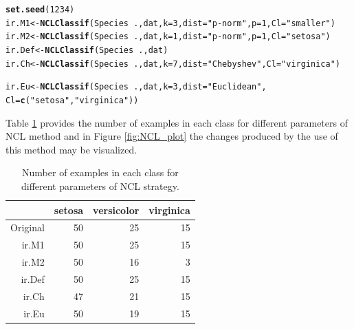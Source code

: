 \documentclass[10pt,a4paper]{article}\usepackage[]{graphicx}\usepackage[]{color}
\makeatletter
\newcommand{\hlnum}[1]{\textcolor[rgb]{0.686,0.059,0.569}{#1}}%
\newcommand{\hlstr}[1]{\textcolor[rgb]{0.192,0.494,0.8}{#1}}%
\newcommand{\hlopt}[1]{\textcolor[rgb]{0,0,0}{#1}}%
\newcommand{\hlstd}[1]{\textcolor[rgb]{0.345,0.345,0.345}{#1}}%
\newcommand{\hlkwb}[1]{\textcolor[rgb]{0.69,0.353,0.396}{#1}}%
\newcommand{\hlkwc}[1]{\textcolor[rgb]{0.333,0.667,0.333}{#1}}%
\newcommand{\hlkwd}[1]{\textcolor[rgb]{0.737,0.353,0.396}{\textbf{#1}}}%
\newenvironment{kframe}{%
 \def\at@end@of@kframe{}%
 \ifinner\ifhmode%
  \def\at@end@of@kframe{\end{minipage}}%
  \begin{minipage}{\columnwidth}%
 \fi\fi%
 \def\FrameCommand##1{\hskip\@totalleftmargin \hskip-\fboxsep
 \colorbox{shadecolor}{##1}\hskip-\fboxsep
     \hskip-\linewidth \hskip-\@totalleftmargin \hskip\columnwidth}%
 \MakeFramed {\advance\hsize-\width
   \@totalleftmargin\z@ \linewidth\hsize
   \@setminipage}}%
 {\par\unskip\endMakeFramed%
 \at@end@of@kframe}
\newenvironment{knitrout}{}{} %
\makeatother
\begin{document}
\begin{knitrout}\footnotesize
{}\color{fgcolor}\begin{kframe}
\begin{alltt}
\hlkwd{set.seed}\hlstd{(}\hlnum{1234}\hlstd{)}
\hlstd{ir.M1} \hlkwb{<-} \hlkwd{NCLClassif}\hlstd{(Species}\hlopt{~}\hlstd{., dat,} \hlkwc{k}\hlstd{=}\hlnum{3}\hlstd{,} \hlkwc{dist}\hlstd{=}\hlstr{"p-norm"}\hlstd{,} \hlkwc{p}\hlstd{=}\hlnum{1}\hlstd{,} \hlkwc{Cl}\hlstd{=}\hlstr{"smaller"}\hlstd{)}
\hlstd{ir.M2}\hlkwb{<-} \hlkwd{NCLClassif}\hlstd{(Species}\hlopt{~}\hlstd{., dat,} \hlkwc{k}\hlstd{=}\hlnum{1}\hlstd{,} \hlkwc{dist}\hlstd{=}\hlstr{"p-norm"}\hlstd{,} \hlkwc{p}\hlstd{=}\hlnum{1}\hlstd{,} \hlkwc{Cl}\hlstd{=}\hlstr{"setosa"}\hlstd{)}
\hlstd{ir.Def} \hlkwb{<-} \hlkwd{NCLClassif}\hlstd{(Species}\hlopt{~}\hlstd{., dat)}
\hlstd{ir.Ch} \hlkwb{<-} \hlkwd{NCLClassif}\hlstd{(Species}\hlopt{~}\hlstd{., dat,} \hlkwc{k}\hlstd{=}\hlnum{7}\hlstd{,} \hlkwc{dist}\hlstd{=}\hlstr{"Chebyshev"}\hlstd{,} \hlkwc{Cl}\hlstd{=}\hlstr{"virginica"}\hlstd{)}
\end{alltt}


{\ttfamily\noindent\color{warningcolor}{\#\# Warning: ENNClassif found no examples to remove!}}\begin{alltt}
\hlstd{ir.Eu} \hlkwb{<-} \hlkwd{NCLClassif}\hlstd{(Species}\hlopt{~}\hlstd{., dat,} \hlkwc{k}\hlstd{=}\hlnum{3}\hlstd{,} \hlkwc{dist}\hlstd{=}\hlstr{"Euclidean"}\hlstd{,}
                    \hlkwc{Cl}\hlstd{=}\hlkwd{c}\hlstd{(}\hlstr{"setosa"}\hlstd{,} \hlstr{"virginica"}\hlstd{))}
\end{alltt}
\end{kframe}
\end{knitrout}


Table \ref{tab:iris_NCL_table} provides the number of examples in each class for different parameters of NCL method and in Figure \ref{fig:NCL_plot} the changes produced by the use of this method may be visualized.


\begin{table}[ht]
\centering
\begin{tabular}{rrrr}
  \hline
 & setosa & versicolor & virginica \\ 
  \hline
Original &  50 &  25 &  15 \\ 
  ir.M1 &  50 &  25 &  15 \\ 
  ir.M2 &  50 &  16 &   3 \\ 
  ir.Def &  50 &  25 &  15 \\ 
  ir.Ch &  47 &  21 &  15 \\ 
  ir.Eu &  50 &  19 &  15 \\ 
   \hline
\end{tabular}
\caption{Number of examples in each class for different parameters of NCL strategy.} 
\label{tab:iris_NCL_table}
\end{table}
\end{document}
